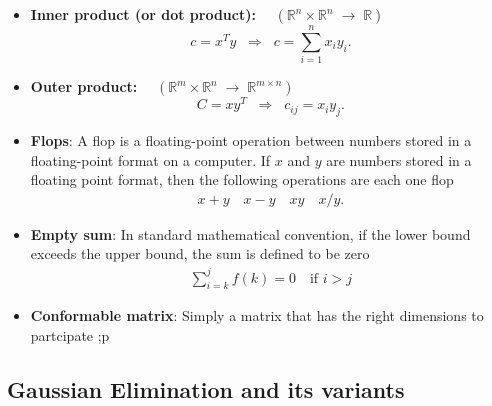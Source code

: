 \documentclass{report}
\begin{document}
\begin{itemize}
        \item \textbf{Inner product (or dot product): } $\quad (\mathbb{R}^n \times \mathbb{R}^n \;\to\; \mathbb{R})$
            \[
                c = x^T y 
                \;\;\Longrightarrow\;\; 
                c = \sum_{i=1}^{n} x_i y_i.
            \]

            \item \textbf{Outer product: } $\quad (\mathbb{R}^m \times \mathbb{R}^n \;\to\; \mathbb{R}^{m \times n})$
            \[
                C = x y^T 
                \;\;\Longrightarrow\;\; 
                c_{ij} = x_i y_j.
            \]
        \item \textbf{Flops}: A flop is a floating-point operation between numbers stored in a floating-point format on a computer.
            \bigbreak \noindent 
            If $x$ and $y$ are numbers stored in a floating point format, then the following operations are each one flop
            \begin{align*}
                x + y \quad x - y \quad xy \quad x / y
            .\end{align*}

        \item \textbf{Empty sum}: In standard mathematical convention, if the lower bound exceeds the upper bound, the sum is defined to be zero
            \begin{align*}
                \sum_{i=k}^{j} f(k) = 0 \quad \text{if } i > j
            \end{align*}

        \item \textbf{Conformable matrix}: Simply a matrix that has the right dimensions to partcipate
            ;p





    \end{itemize}



    \pagebreak \bigbreak \noindent 
    \subsection{Gaussian Elimination and its variants}
    \bigbreak \noindent 
\end{document}
